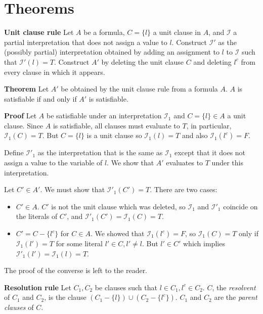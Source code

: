 \documentclass[11pt]{report}
\begin{document}

\section{Theorems}\label{s.theorems}

\textbf{Unit clause rule} Let $A$ be a formula, $C=\{l\}$ a unit clause in $A$, and $\mathcal{I}$ a partial interpretation that does not assign a value to $l$. Construct $\mathcal{I}'$ as the (possibly partial) interpretation obtained by adding an assignment to $l$ to $\mathcal{I}$ such that $\mathcal{I}'(l)=T$. Construct $A'$ by deleting the unit clause $C$ and deleting $l^{c}$ from every clause in which it appears.

\textbf{Theorem} Let $A'$ be obtained by the unit clause rule from a formula $A$. $A$ is satisfiable if and only if $A'$ is satisfiable.

\textbf{Proof} Let $A$ be satisfiable under an interpretation $\mathcal{I}_1$ and $C=\{l\}\in A$ a unit clause. Since $A$ is satisfiable, all clauses must evaluate to $T$, in particular, $\mathcal{I}_1(C)=T$. But $C=\{l\}$ is a unit clause so $\mathcal{I}_1(l)=T$ and also $\mathcal{I}_1(l^c)=F$.

Define $\mathcal{I}'_1$ as the interpretation that is the same as $\mathcal{I}_1$ except that it does not assign a value to the variable of $l$. We show that $A'$ evaluates to $T$ under this interpretation.

Let $C'\in A'$. We must show that $\mathcal{I}'_1(C')=T$. There are two cases:
\begin{itemize}

\item $C'\in A$. $C'$ is not the unit clause which was deleted, so $\mathcal{I}_1$ and $\mathcal{I}'_1$ coincide on the literals of $C'$, and $\mathcal{I}'_1(C')=\mathcal{I}_1(C)=T$.

\item $C'=C-\{l^c\}$ for $C\in A$. We showed that $\mathcal{I}_1(l^c)=F$, so $\mathcal{I}_1(C)=T$ only if $\mathcal{I}_1(l')=T$ for some literal $l'\in C, l' \neq l$. But $l'\in C'$ which implies $\mathcal{I}'_1(l')=\mathcal{I}_1(l)=T$.
\end{itemize}
The proof of the converse is left to the reader.

\bigskip

\textbf{Resolution rule} Let $C_{1},C_{2}$ be clauses such that $l\in
C_{1},l^{c}\in C_{2}$. $C$, the \emph{resolvent} of $C_{1}$ and $C_{2}$,
is the clause $(C_{1}-\{l\}) \cup (C_{2}-\{l^{c}\})$. $C_{1}$ and
$C_{2}$ are the \emph{parent clauses} of $C$.
\end{document}
